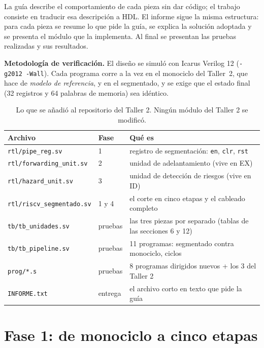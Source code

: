 \documentclass[11pt,letterpaper]{article}
\newcommand{\cod}[1]{\texttt{#1}}
\begin{document}
La gu\'ia describe el comportamiento de cada pieza sin dar c\'odigo; el trabajo consiste en traducir esa
descripci\'on a HDL. El informe sigue la misma estructura: para cada pieza se resume lo que pide la
gu\'ia, se explica la soluci\'on adoptada y se presenta el m\'odulo que la implementa. Al final se
presentan las pruebas realizadas y sus resultados.

\textbf{Metodolog\'ia de verificaci\'on.} El dise\~no se simul\'o con Icarus Verilog 12 (\cod{-g2012 -Wall}). Cada
programa corre a la vez en el monociclo del Taller~2, que hace de \emph{modelo de referencia}, y en el
segmentado, y se exige que el estado final (32 registros y 64 palabras de memoria) sea id\'entico.

\begin{table}[!htbp]
\centering\small
\begin{tabular}{@{}l l l@{}}
\toprule
\textbf{Archivo} & \textbf{Fase} & \textbf{Qu\'e es} \\
\midrule
\cod{rtl/pipe\_reg.sv}         & 1 & registro de segmentaci\'on: \cod{en}, \cod{clr}, \cod{rst} \\
\cod{rtl/forwarding\_unit.sv}  & 2 & unidad de adelantamiento (vive en EX) \\
\cod{rtl/hazard\_unit.sv}      & 3 & unidad de detecci\'on de riesgos (vive en ID) \\
\cod{rtl/riscv\_segmentado.sv} & 1 y 4 & el corte en cinco etapas y el cableado completo \\
\cod{tb/tb\_unidades.sv}       & pruebas & las tres piezas por separado (tablas de las secciones 6 y 12) \\
\cod{tb/tb\_pipeline.sv}       & pruebas & 11 programas: segmentado contra monociclo, ciclos \\
\cod{prog/*.s}                 & pruebas & 8 programas dirigidos nuevos + los 3 del Taller 2 \\
\cod{INFORME.txt}              & entrega & el archivo corto en texto que pide la gu\'ia \\
\bottomrule
\end{tabular}
\caption{Lo que se a\~nadi\'o al repositorio del Taller 2. Ning\'un m\'odulo del Taller 2 se modific\'o.}
\end{table}

\section{Fase 1: de monociclo a cinco etapas}
\end{document}
